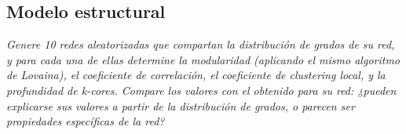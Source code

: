 \documentclass[12pt]{article}
\begin{document}
\subsection{Modelo estructural} 
\textit{Genere 10 redes aleatorizadas que compartan la distribución de grados de su red, y para cada una de ellas determine la modularidad (aplicando el mismo algoritmo de Lovaina), el coeficiente de correlación, el coeficiente de clustering local, y la profundidad de k-cores. Compare los valores con el obtenido para su red: ¿pueden explicarse sus valores a partir de la distribución de grados, o parecen ser propiedades específicas de la red?}
\end{document}

